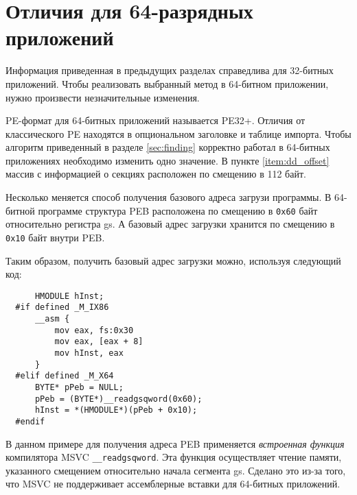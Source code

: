 \section{Отличия для 64-разрядных приложений}
Информация приведенная в предыдущих разделах справедлива для 32-битных
приложений. Чтобы реализовать выбранный метод в 64-битном приложении, нужно
произвести незначительные изменения.

PE-формат для 64-битных приложений называется PE32+. Отличия от классического PE
находятся в опциональном заголовке и таблице импорта. Чтобы алгоритм приведенный
в разделе \ref{sec:finding} корректно работал в 64-битных приложениях необходимо
изменить одно значение. В пункте \ref{item:dd_offset} массив с информацией о
секциях расположен по смещению в 112 байт. 

Несколько меняется способ получения базового адреса загрузи программы. В
64-битной программе структура PEB расположена по смещению в \verb!0x60! байт
относительно регистра gs. А базовый адрес загрузки хранится по смещению в
\verb!0x10! байт внутри PEB. 

Таким образом, получить базовый адрес загрузки можно, используя следующий код:
\begin{verbatim}
      HMODULE hInst;
  #if defined _M_IX86
      __asm {
          mov eax, fs:0x30
          mov eax, [eax + 8]
          mov hInst, eax
      }
  #elif defined _M_X64
      BYTE* pPeb = NULL;
      pPeb = (BYTE*)__readgsqword(0x60);
      hInst = *(HMODULE*)(pPeb + 0x10);
  #endif
\end{verbatim}

В данном примере для получения адреса PEB применяется \textit{встроенная
функция} компилятора MSVC \verb!__readgsqword!. Эта функция осуществляет чтение
памяти, указанного смещением относительно начала сегмента gs. Сделано это из-за
того, что MSVC не поддерживает ассемблерные вставки для 64-битных приложений.
